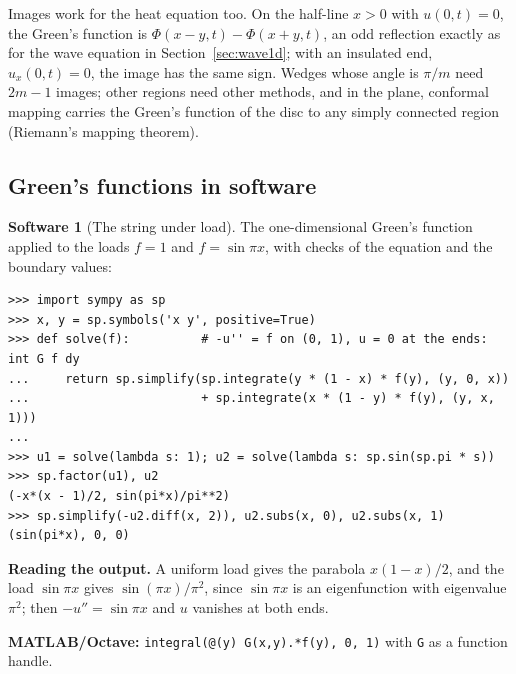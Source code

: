 \documentclass[11pt,a4paper]{article}
\numberwithin{equation}{section}
\theoremstyle{definition}
\newtheorem{software}[thm]{Software}
\begin{document}
Images work for the heat equation too. On the half-line $x > 0$ with $u(0, t) = 0$, the Green's function is $\Phi(x - y, t) - \Phi(x + y, t)$, an odd reflection exactly as for the wave equation in Section~\ref{sec:wave1d}; with an insulated end, $u_x(0, t) = 0$, the image has the same sign. Wedges whose angle is $\pi/m$
need $2m - 1$ images; other regions need other methods, and in the plane, conformal mapping carries the Green's function of the disc to any simply connected region (Riemann's mapping theorem).

\subsection{Green's functions in software}
\label{ssec:software9}

\begin{software}[The string under load]
\label{sw:green1d}
The one-dimensional Green's function applied to the loads $f = 1$ and $f = \sin\pi x$, with checks of the equation and the boundary values:
{\small\begin{verbatim}
>>> import sympy as sp
>>> x, y = sp.symbols('x y', positive=True)
>>> def solve(f):          # -u'' = f on (0, 1), u = 0 at the ends: int G f dy
...     return sp.simplify(sp.integrate(y * (1 - x) * f(y), (y, 0, x))
...                        + sp.integrate(x * (1 - y) * f(y), (y, x, 1)))
...
>>> u1 = solve(lambda s: 1); u2 = solve(lambda s: sp.sin(sp.pi * s))
>>> sp.factor(u1), u2
(-x*(x - 1)/2, sin(pi*x)/pi**2)
>>> sp.simplify(-u2.diff(x, 2)), u2.subs(x, 0), u2.subs(x, 1)
(sin(pi*x), 0, 0)
\end{verbatim}}
\textbf{Reading the output.} A uniform load gives the parabola $x(1 - x)/2$, and the load $\sin\pi x$ gives $\sin(\pi x)/\pi^2$, since $\sin\pi x$ is an eigenfunction with eigenvalue $\pi^2$; then $-u'' = \sin\pi x$ and $u$ vanishes at both ends.

\textbf{MATLAB/Octave:} \texttt{integral(@(y) G(x,y).*f(y), 0, 1)} with \texttt{G} as a function handle.
\end{software}
\end{document}
